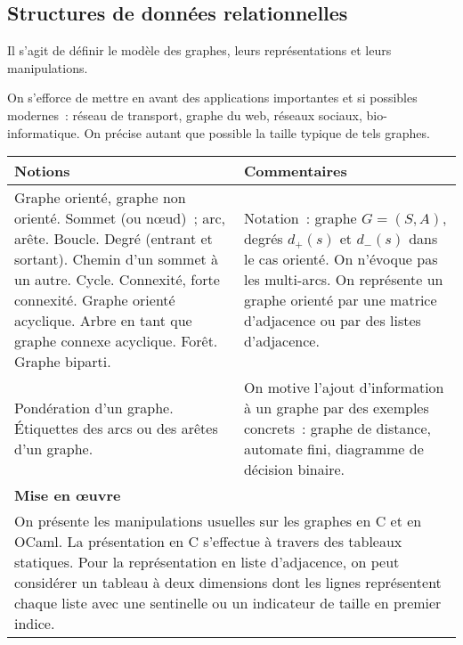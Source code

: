 \subsection{Structures de données relationnelles \semDeux}

Il s'agit de définir le modèle des graphes, leurs représentations et leurs manipulations.

On s'efforce de mettre en avant des applications importantes et si possibles modernes~: réseau de transport, graphe du web, réseaux sociaux, bio-informatique. On précise autant que possible la taille typique de tels graphes.

\begin{longtable}{|p{\lnotion}|p{\comment}|}
    \hline
    \textbf{Notions} & \textbf{Commentaires} \\
    \hline \hline
    Graphe orienté, graphe non orienté. Sommet (ou n\oe ud)~; arc, arête. Boucle. Degré (entrant et sortant). Chemin d'un sommet à un autre. Cycle. Connexité, forte connexité. Graphe orienté acyclique. Arbre en tant que graphe connexe acyclique. Forêt. Graphe biparti.
    &
    Notation~: graphe $G = (S,A)$, degrés $d_+(s)$ et $d_-(s)$ dans le cas orienté. On n'évoque pas les multi-arcs. 
    On représente un graphe orienté par une matrice d'adjacence ou par des listes d'adjacence.
    \\
    \hline
    Pondération d'un graphe. \'Etiquettes des arcs ou des arêtes d'un graphe.
    & On motive l'ajout d'information à un graphe par des exemples concrets~: graphe de distance, automate fini, diagramme de décision binaire.
    \\
    \hline \hline
    \multicolumn{2}{|p{\lmoe}|}{\textbf{Mise en œuvre}} \\
    \hline
    \multicolumn{2}{|p{\lmoe}|}{
     On présente les manipulations usuelles sur les graphes en C et en OCaml.
    La présentation en C s'effectue à travers des tableaux statiques.
    Pour la représentation en liste d'adjacence, on peut considérer un 
    tableau à deux dimensions dont les lignes représentent chaque liste avec 
    une sentinelle ou un indicateur de taille en premier indice. 
    } \\
    \hline
\end{longtable}

